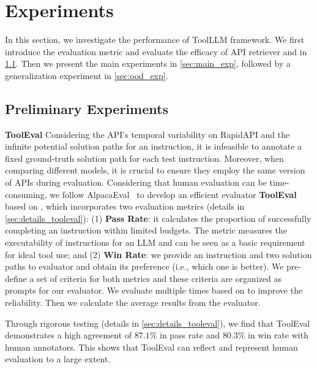 \section{Experiments}
\label{sec:exp_toolllama}
In this section, we investigate the performance of ToolLLM framework. We first introduce the evaluation metric and evaluate the efficacy of API retriever and \dfs in \cref{sec:prelim_exp}. Then we present the main experiments in \cref{sec:main_exp}, followed by a generalization experiment in \cref{sec:ood_exp}.

\subsection{Preliminary Experiments}
\label{sec:prelim_exp}

\textbf{ToolEval} \quad
Considering the API's temporal variability on RapidAPI and the infinite potential solution paths for an instruction, it is infeasible to annotate a fixed ground-truth solution path for each test instruction. Moreover, when comparing different models, it is crucial to ensure they employ the same version of APIs during evaluation.
Considering that human evaluation can be time-consuming, we follow AlpacaEval~\citep{alpaca_eval} to develop an efficient evaluator \textbf{ToolEval} based on \turbo, which incorporates two evaluation metrics (details in \cref{sec:details_tooleval}): (1) \textbf{Pass Rate}: it calculates the proportion of successfully completing an instruction within limited budgets. The metric measures the executability of instructions for an LLM and can be seen as a basic requirement for ideal tool use; and (2) \textbf{Win Rate}: we provide an instruction and two solution paths to \turbo evaluator and obtain its preference (i.e., which one is better). We pre-define a set of criteria for both metrics and these criteria are organized as prompts for our \turbo evaluator. We evaluate multiple times based on \turbo to improve the reliability. Then we calculate the average results from the evaluator.

Through rigorous testing (details in \cref{sec:details_tooleval}), we find that ToolEval demonstrates a high agreement of $87.1\%$ in pass rate and $80.3\%$ in win rate with human annotators. This shows that ToolEval can reflect and represent human evaluation to a large extent.

